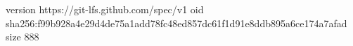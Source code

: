 version https://git-lfs.github.com/spec/v1
oid sha256:f99b928a4e29d4de75a1add78fc48ed857dc61f1d91e8ddb895a6ce174a7afad
size 888
